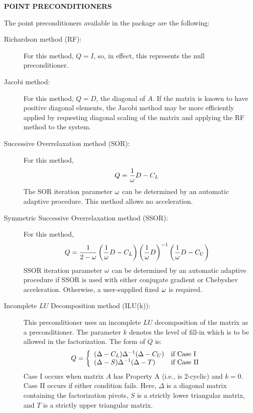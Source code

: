 \bigskip
\noindent
{\bf POINT PRECONDITIONERS}
\bigskip
\indent
 
   The point preconditioners available in the package are the
following:
\bigskip
\begin{description}
\item[Richardson method (RF):]
      For this method, $Q = I$, so, in effect, this represents
      the null preconditioner.
 
\item[Jacobi method:]
      For this method, $Q = D$, the diagonal of $A$.  If the
      matrix is known to have positive diagonal elements,
      the Jacobi method may be more efficiently applied by
      requesting diagonal scaling of the matrix and applying
      the RF method to the system.
 
\item[Successive Overrelaxation method (SOR):]
      For this method,
      \[ Q = \frac{1}{\omega} D-C_L \]
      The SOR iteration parameter $\omega$ can be determined by an 
      automatic adaptive procedure.  This method allows no 
      acceleration.
 
\item[Symmetric Successive Overrelaxation method (SSOR):]
      For this method,
      \[ Q = \frac{1}{2-\omega}
          \left( \frac{1}{\omega} D - C_L\right) \left( \frac{1}{\omega} D \right)^{-1}\left( \frac{1}{\omega} D - C_U \right) \]
      SSOR iteration parameter $\omega$ can be determined by an
      automatic adaptive procedure if SSOR is used with either
      conjugate gradient or Chebyshev acceleration.  Otherwise,
      a user-supplied fixed $\omega$ is required.
 
\item[Incomplete $LU$ Decomposition method (ILU(k)):]
      This preconditioner uses an incomplete $LU$ decomposition of
      the matrix as a preconditioner.  The parameter $k$ denotes
      the level of fill-in which is to be allowed in the
      factorization.  The form of $Q$ is:
      \[
         Q = \left\{ \begin{array}{ll}
          (\Delta - C_L) \Delta^{-1} (\Delta - C_U)  & \mbox{if Case I} \\
          (\Delta - S) \Delta^{-1} (\Delta - T)      & \mbox{if Case II}
      \end{array} \right.
      \]
      Case I occurs when matrix $A$ has Property A (i.e., is 2-cyclic)
      and $k=0$.  Case II occurs if either condition fails.
      Here, $\Delta$ is a diagonal matrix containing the factorization
      pivots, $S$ is a strictly lower triangular matrix, and $T$ is
      a strictly upper triangular matrix.  
 

\end{description}
